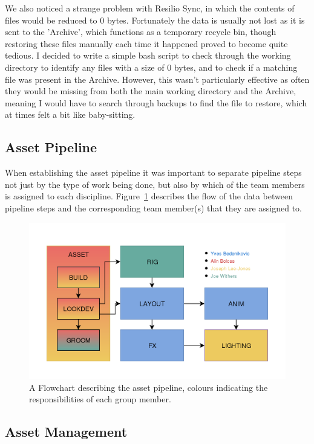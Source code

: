 \documentclass[11pt]{article}
\begin{document}
We also noticed a strange problem with Resilio Sync, in which the contents of files would be reduced to 0 bytes. Fortunately the data is usually not lost as it is sent to the 'Archive', which functions as a temporary recycle bin, though restoring these files manually each time it happened proved to become quite tedious. I decided to write a simple bash script to check through the working directory to identify any files with a size of 0 bytes, and to check if a matching file was present in the Archive. However, this wasn't particularly effective as often they would be missing from both the main working directory and the Archive, meaning I would have to search through backups to find the file to restore, which at times felt a bit like baby-sitting.

\subsection{Asset Pipeline}

When establishing the asset pipeline it was important to separate pipeline steps not just by the type of work being done, but also by which of the team members is assigned to each discipline. Figure~\ref{figure:pipelineFlow} describes the flow of the data between pipeline steps and the corresponding team member(s) that they are assigned to.

\begin{figure}[htbp]\centering
	\includegraphics[width=1.0\linewidth]{images/pipeline.png}
	\caption{\label{figure:pipelineFlow} A Flowchart describing the asset pipeline, colours indicating the responsibilities of each group member.}
\end{figure}

\subsection{Asset Management} \label{assman}
\end{document}
